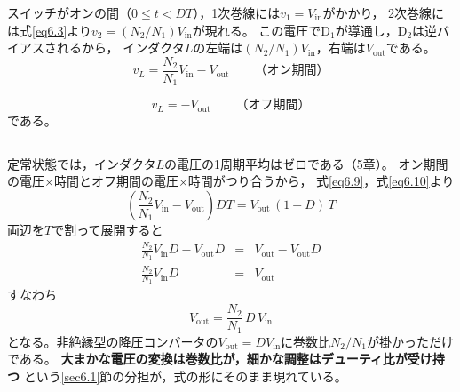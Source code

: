 スイッチがオンの間（$0 \le t < DT$），1次巻線には$v_1 = V_{\mathrm{in}}$がかかり，
2次巻線には式\ref{eq6.3}より$v_2 = (N_2/N_1)V_{\mathrm{in}}$が現れる。
この電圧で$\mathrm{D_1}$が導通し，$\mathrm{D_2}$は逆バイアスされるから，
インダクタ$L$の左端は$(N_2/N_1)V_{\mathrm{in}}$，右端は$V_{\mathrm{out}}$である。
\begin{equation}
v_L = \frac{N_2}{N_1}V_{\mathrm{in}} - V_{\mathrm{out}} \qquad （オン期間）
\label{eq6.9}
\end{equation}

\begin{equation}
v_L = -V_{\mathrm{out}} \qquad （オフ期間）
\label{eq6.10}
\end{equation}
である。

\subsection{}

定常状態では，インダクタ$L$の電圧の1周期平均はゼロである（5章）。
オン期間の電圧$\times$時間とオフ期間の電圧$\times$時間がつり合うから，
式\ref{eq6.9}，式\ref{eq6.10}より
\begin{equation}
\left(\frac{N_2}{N_1}V_{\mathrm{in}} - V_{\mathrm{out}}\right) DT = V_{\mathrm{out}}\,(1-D)\,T
\label{eq6.11}
\end{equation}
両辺を$T$で割って展開すると
\begin{eqnarray}
\frac{N_2}{N_1}V_{\mathrm{in}}D - V_{\mathrm{out}} D &=& V_{\mathrm{out}} - V_{\mathrm{out}} D \nonumber\\
\frac{N_2}{N_1}V_{\mathrm{in}}D &=& V_{\mathrm{out}} \nonumber
\end{eqnarray}
すなわち
\begin{equation}
V_{\mathrm{out}} = \frac{N_2}{N_1}\,D\,V_{\mathrm{in}}
\label{eq6.12}
\end{equation}
となる。非絶縁型の降圧コンバータの$V_{\mathrm{out}} = DV_{\mathrm{in}}$に巻数比$N_2/N_1$が掛かっただけである。
\textbf{大まかな電圧の変換は巻数比が，細かな調整はデューティ比が受け持つ}
という\ref{sec6.1}節の分担が，式の形にそのまま現れている。

